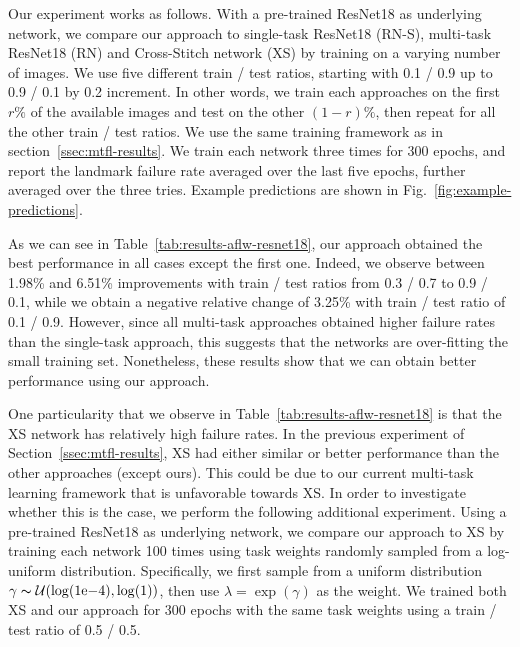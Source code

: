 \documentclass[runningheads]{llncs}
\begin{document}
Our experiment works as follows. With a pre-trained ResNet18 as underlying network, we compare our approach to single-task ResNet18 (RN-S), multi-task ResNet18 (RN) and Cross-Stitch network (XS) by training on a varying number of images. We use five different train / test ratios, starting with 0.1 / 0.9 up to 0.9 / 0.1 by 0.2 increment. In other words, we train each approaches on the first $r\%$ of the available images and test on the other $(1-r)\%$, then repeat for all the other train / test ratios. We use the same training framework as in section~\ref{ssec:mtfl-results}. We train each network three times for 300 epochs, and report the landmark failure rate averaged over the last five epochs, further averaged over the three tries. Example predictions are shown in Fig.~\ref{fig:example-predictions}.

As we can see in Table~\ref{tab:results-aflw-resnet18}, our approach obtained the best performance in all cases except the first one. Indeed, we observe between 1.98\% and 6.51\% improvements with train / test ratios from 0.3 / 0.7 to 0.9 / 0.1, while we obtain a negative relative change of 3.25\% with train / test ratio of 0.1 / 0.9. However, since all multi-task approaches obtained higher failure rates than the single-task approach, this suggests that the networks are over-fitting the small training set. Nonetheless, these results show that we can obtain better performance using our approach.

One particularity that we observe in Table~\ref{tab:results-aflw-resnet18} is that the XS network has relatively high failure rates. In the previous experiment of Section~\ref{ssec:mtfl-results}, XS had either similar or better performance than the other approaches (except ours). This could be due to our current multi-task learning framework that is unfavorable towards XS. In order to investigate whether this is the case, we perform the following additional experiment. Using a pre-trained ResNet18 as underlying network, we compare our approach to XS by training each network 100 times using task weights randomly sampled from a log-uniform distribution. Specifically, we first sample from a uniform distribution $\gamma \thicksim \mathcal{U}(\log(1\mathrm{e}{-4}), \log(1))$, then use $\lambda = \exp(\gamma)$ as the weight. We trained both XS and our approach for 300 epochs with the same task weights using a train / test ratio of 0.5 / 0.5. 
\end{document}
